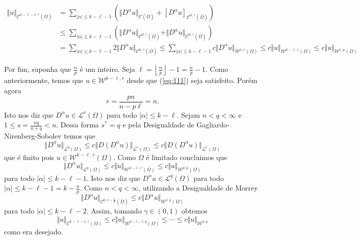 \documentclass[a4paper, 11pt]{book}
\theoremstyle{definition}
\newcommand{\cC}{\mathcal{C}}
\newcommand{\cL}{\mathcal{L}}
\newcommand{\cW}{\mathcal{W}}
\begin{document}
\begin{prf}
    \[
        \begin{aligned}
            \Vert u \Vert_{\cC^{k-\ell-1,\gamma}(\overline\Omega)} &= \sum_{|\alpha| \leqslant k - \ell - 1} \left( \Vert D^\alpha u \Vert_{\cC(\overline\Omega)} + [D^\alpha u]_{\cC^{0,\gamma}(\overline\Omega)} \right)\\ &\leqslant \sum_{|\alpha| \leqslant k - \ell - 1} \left(    \Vert D^\alpha u \Vert_{\cC^{0,\gamma}(\overline\Omega)} +  \Vert D^\alpha u \Vert_{\cC^{0,\gamma}(\overline\Omega)}\right)\\
            &=\sum_{|\alpha| \leqslant k - \ell - 1}\!\!\!\! 2\Vert D^\alpha u \Vert_{\cC^{0,\gamma}(\overline\Omega)} \leqslant \sum_{|\alpha| \leqslant k - \ell - 1} \!\!\! c\Vert D^\alpha u \Vert_{\cW^{1,r}(\Omega)} \leqslant c \Vert u \Vert_{\cW^{k-\ell,r}(\Omega)} \leqslant c \Vert u \Vert_{\cW^{1,p}(\Omega)}
        \end{aligned}
    \]

    Por fim, suponha que $\frac{n}{p}$ é um inteiro. Seja $\ell = \left\lfloor \frac{n}{p} \right\rfloor - 1 = \frac{n}{p} - 1$.
    Como anteriormente, temos que $u \in \cW^{k-\ell,r}$ desde que (\ref{eq:111}) seja satisfeito. Porém agora
    \[
        r = \frac{pn}{n - p\ell} = n.
    \]
    Isto nos diz que $D^\alpha u \in \cL^r(\Omega)$ para todo $|\alpha| \leqslant k - \ell$.
    Sejam $n < q < \infty$ e $1 \leqslant s = \frac{nq}{n + q} < n$. Dessa forma $s^* = q$ e pela Desigualdade de Gagliardo-Nirenberg-Sobolev temos que
    \[
        \Vert D^\alpha u \Vert_{\cL^q(\Omega)}\leqslant c\Vert D(D^\alpha u) \Vert_{\cL^s(\Omega)} \leqslant c \Vert D(D^\alpha u) \Vert_{\cL^r(\Omega)}
    \]
    que é finito pois $u \in \cW^{k-\ell,r}(\Omega)$.
    Como $\Omega$ é limitado concluimos que
    \[
        \Vert D^\alpha u \Vert_{\cL^q(\Omega)} \leqslant c \Vert u \Vert_{\cW^{k-\ell,r}(\Omega)} \leqslant c \Vert u \Vert_{\cW^{k,p}(\Omega)}
    \]
    para todo $|\alpha| \leqslant k - \ell - 1$. Isto nos diz que $D^\alpha u \in \cL^q(\Omega)$ para todo $|\alpha| \leqslant k - \ell - 1 = k - \frac{n}{p}$.
    Como $n < q < \infty$, utilizando a Desigualdade de Morrey
    \[
        \Vert D^\alpha u \Vert_{\cC^{0,1 - \frac{n}{q}}(\overline\Omega)} \leqslant c \Vert D^\alpha u \Vert_{\cW^{1,q}(\Omega)}
    \]
    para todo $|\alpha| \leqslant k - \ell - 2$.
    Assim, tomando $\gamma \in (0,1)$ obtemos
    \[
        \Vert u \Vert_{\cC^{k-\ell-1,\gamma}(\Omega)} \leqslant c\Vert u \Vert_{\cW^{k-l-1,q}(\Omega)} \leqslant \cdots \leqslant c \Vert u \Vert_{\cW^{k,p}}
    \]
    como era desejado.
\end{prf}
\end{document}
